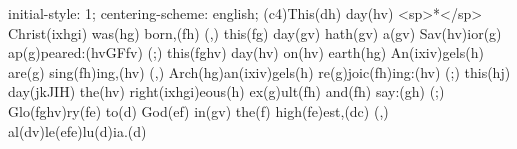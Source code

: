 initial-style: 1;
centering-scheme: english;
(c4)This(dh) day(hv) <sp>*</sp> Christ(ixhgi) was(hg) born,(fh) (,) this(fg) day(gv) hath(gv) a(gv) Sav(hv)ior(g) ap(g)peared:(hvGFfv) (;) this(fghv) day(hv) on(hv) earth(hg) An(ixiv)gels(h) are(g) sing(fh)ing,(hv) (,) Arch(hg)an(ixiv)gels(h) re(g)joic(fh)ing:(hv) (;) this(hj) day(jkJIH) the(hv) right(ixhgi)eous(h) ex(g)ult(fh) and(fh) say:(gh) (;) Glo(fghv)ry(fe) to(d) God(ef) in(gv) the(f) high(fe)est,(dc) (,) al(dv)le(efe)lu(d)ia.(d)
